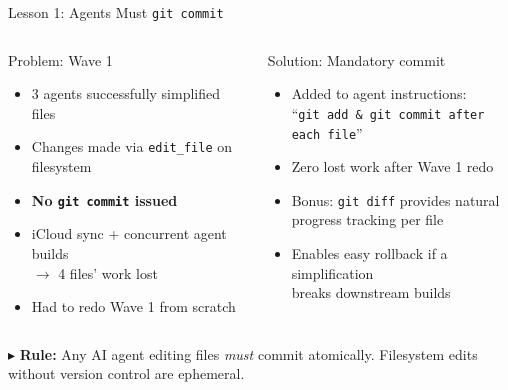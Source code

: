 \documentclass[aspectratio=169,10pt]{beamer}
\begin{document}
\begin{frame}{Lesson 1: Agents Must \texttt{git commit}}
    \vspace{-0.5em}
    \begin{columns}[T]
        \begin{block}{\textcolor{softred}{Problem: Wave 1}}
            \begin{itemize}\itemsep0.2em\small
                \item 3 agents successfully simplified files
                \item Changes made via \texttt{edit\_file} on filesystem
                \item \textbf{No \texttt{git commit} issued}
                \item iCloud sync + concurrent agent builds\\
                      $\to$ \textcolor{softred}{4 files' work lost}
                \item Had to redo Wave 1 from scratch
            \end{itemize}
        \end{block}

        \begin{block}{\textcolor{leangreen}{Solution: Mandatory commit}}
            \begin{itemize}\itemsep0.2em\small
                \item Added to agent instructions:\\
                      ``\texttt{git add \& git commit after each file}''
                \item \textcolor{leangreen}{Zero lost work} after Wave 1 redo
                \item Bonus: \texttt{git diff} provides natural\\
                      progress tracking per file
                \item Enables easy rollback if a simplification\\
                      breaks downstream builds
            \end{itemize}
        \end{block}
    \end{columns}

    \vspace{0.5em}
    \begin{center}
    {\small\textcolor{amber}{$\blacktriangleright$}
    \textbf{Rule:} Any AI agent editing files \emph{must} commit atomically.
    Filesystem edits without version control are ephemeral.}
    \end{center}
\end{frame}
\end{document}
